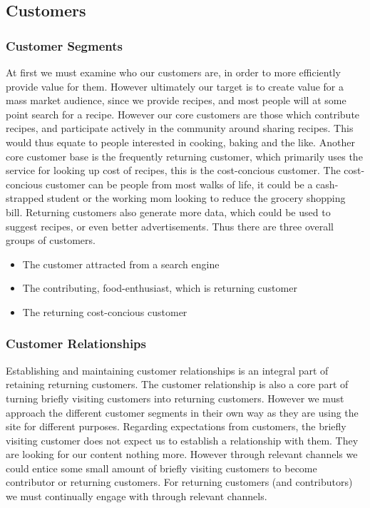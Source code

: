 \documentclass{article}
\begin{document}
\subsection{Customers}
\subsubsection{Customer Segments}
At first we must examine who our customers are, in order to more efficiently provide value
for them. However ultimately our target is to create value for a mass market audience,
since we provide recipes, and most people will at some point search for a recipe.  However
our core customers are those which contribute recipes, and participate actively in the
community around sharing recipes. This would thus equate to people interested in cooking,
baking and the like.  Another core customer base is the frequently returning customer,
which primarily uses the service for looking up cost of recipes, this is the cost-concious
customer. The cost-concious customer can be people from most walks of life, it could be a
cash-strapped student or the working mom looking to reduce the grocery shopping bill.
Returning customers also generate more data, which could be used to suggest recipes, or
even better advertisements. Thus there are three overall groups of customers.

\begin{itemize}
  \item The customer attracted from a search engine
  \item The contributing, food-enthusiast, which is returning customer
  \item The returning cost-concious customer
\end{itemize}

\subsubsection{Customer Relationships}
Establishing and maintaining customer relationships is an integral part of retaining
returning customers. The customer relationship is also a core part of turning briefly
visiting customers into returning customers. However we must approach the different
customer segments in their own way as they are using the site for different purposes.
Regarding expectations from customers, the briefly visiting customer does not expect us to
establish a relationship with them. They are looking for our content nothing more. However
through relevant channels we could entice some small amount of briefly visiting customers
to become contributor or returning customers.
For returning customers (and contributors) we must continually engage with through
relevant channels.
\end{document}
